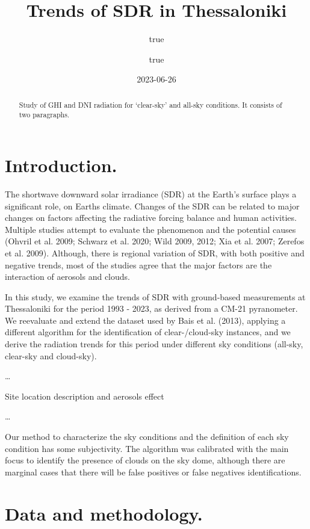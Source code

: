 \documentclass[
  preprint, 3p, authoryear]{article}
\title{Trends of SDR in Thessaloniki}
\author{true \and true}
\date{2023-06-26}
\begin{document}
\maketitle
\begin{abstract}
Study of GHI and DNI radiation for `clear-sky' and all-sky conditions.
It consists of two paragraphs.
\end{abstract}

{
\setcounter{tocdepth}{4}
\tableofcontents
}
\hypertarget{introduction.}{%
\section{Introduction.}\label{introduction.}}

The shortwave downward solar irradiance (SDR) at the Earth's surface plays a significant role, on Earths climate.
Changes of the SDR can be related to major changes on factors affecting the radiative forcing balance and human activities.
Multiple studies attempt to evaluate the phenomenon and the potential causes (Ohvril et al. 2009; Schwarz et al. 2020; Wild 2009, 2012; Xia et al. 2007; Zerefos et al. 2009).
Although, there is regional variation of SDR, with both positive and negative trends, most of the studies agree that the major factors are the interaction of aerosols and clouds.

In this study, we examine the trends of SDR with ground-based measurements at Thessaloniki for the period 1993 - 2023, as derived from a CM-21 pyranometer.
We reevaluate and extend the dataset used by Bais et al. (2013), applying a different algorithm for the identification of clear-/cloud-sky instances, and we derive the radiation trends for this period under different sky conditions (all-sky, clear-sky and cloud-sky).

\ldots{}

Site location description and aerosols effect

\ldots{}

Our method to characterize the sky conditions and the definition of each sky condition has some subjectivity.
The algorithm was calibrated with the main focus to identify the presence of clouds on the sky dome, although there are marginal cases that there will be false positives or false negatives identifications.

\hypertarget{data-and-methodology.}{%
\section{Data and methodology.}\label{data-and-methodology.}}
\end{document}
